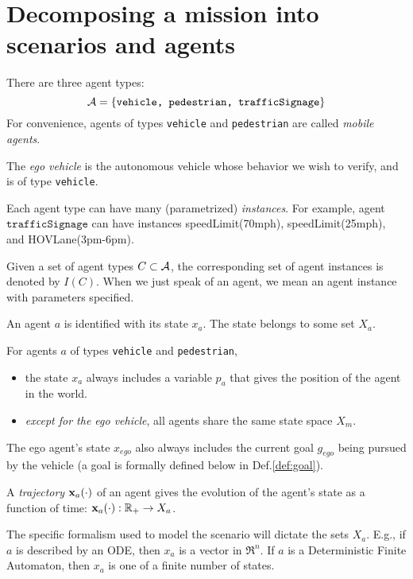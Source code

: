 \section{Decomposing a mission into scenarios and agents}
\label{scenarios and agents}

\begin{defn}[Agents]
	There are three agent types:
	\[\mathcal{A} = \{\texttt{vehicle, pedestrian, trafficSignage}\}\]
	For convenience, agents of types  \texttt{vehicle} and \texttt{pedestrian} are called \emph{mobile agents}. 
	
	The \emph{ego vehicle} is the autonomous vehicle whose behavior we wish to verify, and is of type \texttt{vehicle}.	
\end{defn}
	
	Each agent type can have many (parametrized) \emph{instances}.
	For example, agent $\texttt{trafficSignage}$ can have instances speedLimit(70mph), speedLimit(25mph), and HOVLane(3pm-6pm).
	
	Given a set of agent types $C \subset \mathcal{A}$, the corresponding set of agent instances is denoted by $I(C)$.
When we just speak of an agent, we mean an agent instance with parameters specified.

\begin{defn}
	\label{def:agent state}
An agent $a$ is identified with its state $x_a$. 
The state belongs to some set $X_a$. 

For agents $a$ of types \texttt{vehicle} and \texttt{pedestrian}, 
\begin{itemize}
	\item the state $x_a$ always includes a variable $p_a$ that gives the position of the agent in the world.
	\item \emph{except for the ego vehicle}, all agents share the same state space $X_m$.
\end{itemize}

The ego agent's state $x_{ego}$ also always includes the current goal $g_{ego}$ being pursued by the vehicle (a goal is formally defined below in Def.\ref{def:goal}).

A \emph{trajectory} $\mathbf{x}_a(\cdot)$ of an agent gives the evolution of the agent's state as a function of time: $\mathbf{x}_a(\cdot): \mathbb{R}_+ \rightarrow X_a$.
\end{defn}

The specific formalism used to model the scenario will dictate the sets $X_a$.
E.g., if $a$ is described by an ODE, then $x_a$ is a vector in $\Re^n$.
If $a$ is a Deterministic Finite Automaton, then $x_a$ is one of a finite number of states.

